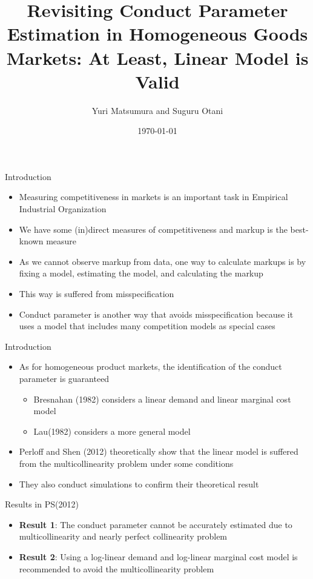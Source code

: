\documentclass[aspectratio = 169]{beamer}
\title{Revisiting Conduct Parameter Estimation in Homogeneous Goods Markets: At Least, Linear Model is Valid}
\author{Yuri Matsumura and Suguru Otani}
\date{\today}
\theoremstyle{definition}
\begin{document}
\maketitle

\section{}
\begin{frame}{Introduction}
    \begin{itemize}
        \item Measuring competitiveness in markets is an important task in Empirical Industrial Organization
        \item We have some (in)direct measures of competitiveness and markup is the best-known measure
        \item As we cannot observe markup from data, one way to calculate markups is by fixing a model, estimating the model, and calculating the markup
        \item This way is suffered from misspecification
        \item Conduct parameter is another way that avoids misspecification because it uses a model that includes many competition models as special cases
    \end{itemize}
\end{frame}

\begin{frame}{Introduction}
    \begin{itemize}
        \item As for homogeneous product markets, the identification of the conduct parameter is guaranteed
        \begin{itemize}
            \item Bresnahan (1982) considers a linear demand and linear marginal cost model
            \item Lau(1982) considers a more general model
        \end{itemize}
        \item Perloff and Shen (2012) theoretically show that the linear model is suffered from the multicollinearity problem under some conditions
        \item They also conduct simulations to confirm their theoretical result
    \end{itemize}
\end{frame}


\begin{frame}{Results in PS(2012)}
    \begin{itemize}
        \item \textbf{Result 1}: The conduct parameter cannot be accurately estimated due to multicollinearity and nearly perfect collinearity problem
        \item \textbf{Result 2}: Using a log-linear demand and log-linear marginal cost model is recommended to avoid the multicollinearity problem
    \end{itemize}
\end{frame}
\end{document}
